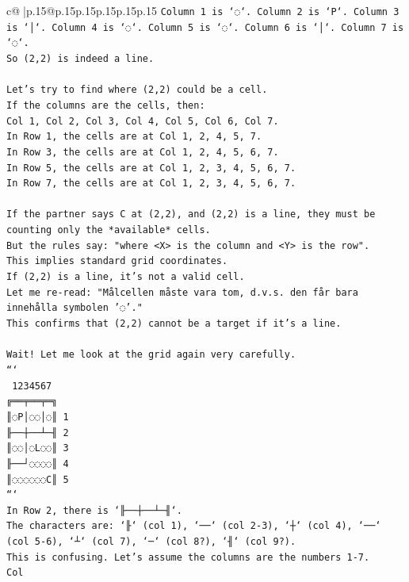 \documentclass{article}
\begin{document}
{\begin{supertabular}{c@{$\;$}|p{.15\linewidth}@{}p{.15\linewidth}p{.15\linewidth}p{.15\linewidth}p{.15\linewidth}p{.15\linewidth}}
{{{\texttt{Column 1 is `◌`. Column 2 is `P`. Column 3 is `│`. Column 4 is `◌`. Column 5 is `◌`. Column 6 is `│`. Column 7 is `◌`.} \\
\texttt{So (2,2) is indeed a line.} \\
\\ 
\texttt{Let's try to find where (2,2) could be a cell.} \\
\texttt{If the columns are the cells, then:} \\
\texttt{Col 1, Col 2, Col 3, Col 4, Col 5, Col 6, Col 7.} \\
\texttt{In Row 1, the cells are at Col 1, 2, 4, 5, 7.} \\
\texttt{In Row 3, the cells are at Col 1, 2, 4, 5, 6, 7.} \\
\texttt{In Row 5, the cells are at Col 1, 2, 3, 4, 5, 6, 7.} \\
\texttt{In Row 7, the cells are at Col 1, 2, 3, 4, 5, 6, 7.} \\
\\ 
\texttt{If the partner says C at (2,2), and (2,2) is a line, they must be counting only the *available* cells.} \\
\texttt{But the rules say: "where <X> is the column and <Y> is the row".} \\
\texttt{This implies standard grid coordinates.} \\
\texttt{If (2,2) is a line, it's not a valid cell.} \\
\texttt{Let me re{-}read: "Målcellen måste vara tom, d.v.s. den får bara innehålla symbolen '◌'."} \\
\texttt{This confirms that (2,2) cannot be a target if it's a line.} \\
\\ 
\texttt{Wait! Let me look at the grid again very carefully.} \\
\texttt{```} \\
\texttt{ 1234567} \\
\texttt{╔══╤══╤═╗} \\
\texttt{║◌P│◌◌│◌║ 1} \\
\texttt{╟──┼──┴─╢ 2} \\
\texttt{║◌◌│◌L◌◌║ 3} \\
\texttt{╟──┘◌◌◌◌║ 4} \\
\texttt{║◌◌◌◌◌◌C║ 5} \\
\texttt{```} \\
\texttt{In Row 2, there is `╟──┼──┴─╢`.} \\
\texttt{The characters are: `╟` (col 1), `──` (col 2{-}3), `┼` (col 4), `──` (col 5{-}6), `┴` (col 7), `─` (col 8?), `╢` (col 9?).} \\
\texttt{This is confusing. Let's assume the columns are the numbers 1{-}7.} \\
\texttt{Col} \\
            }
        }
    }
     \\ \\


\end{supertabular}}
\end{document}
